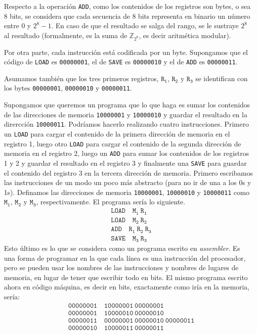\documentclass[a4paper, 12pt]{report}
\begin{document}
Respecto a la operación {\tt ADD}, como los contenidos de los registros son bytes, o sea 8 bits, se considera que cada secuencia de 8 bits representa en binario un número entre $0$ y $2^8-1$. En caso de que el resultado se salga del rango, se le sustraye $2^8$ al resultado (formalmente, es la suma de $\mathbb{Z}_{2^8}$, es decir aritmética modular).

Por otra parte, cada instrucción está codificada por un byte. Supongamos que el código de {\tt LOAD} es {\tt 00000001}, el de {\tt SAVE} es {\tt 00000010} y el de {\tt ADD} es {\tt 00000011}.

Asumamos también que los tres primeros registros, $\mathtt{R_1}$, $\mathtt{R_2}$ y $\mathtt{R_3}$ se identifican con los bytes {\tt 00000001}, {\tt 00000010} y {\tt 00000011}.

Supongamos que queremos un programa que lo que haga es sumar los contenidos de las direcciones de memoria {\tt 10000001} y {\tt 10000010} y guardar el resultado en la dirercción {\tt 10000011}. Podríamos hacerlo realizando cuatro instrucciones. Primero un {\tt LOAD} para cargar el contenido de la primera dirección de memoria en el registro 1, luego otro {\tt LOAD} para cargar el contenido de la segunda dirección de memoria en el registro 2, luego un {\tt ADD} para sumar los contenidos de los registros 1 y 2 y guardar el resultado en el registro 3 y finalmente una {\tt SAVE} para guardar el contenido del registro 3 en la tercera dirección de memoria. Primero escribamos las instrucciones de un modo un poco más abstracto (para no ir de una a los 0s y 1s).  Definamos las direcciones de memoria {\tt 10000001}, {\tt 10000010} y {\tt 10000011} como $\mathtt{M_1}$, $\mathtt{M_2}$ y $\mathtt{M_3}$, respectivamente. El programa sería lo siguiente.
\begin{align*}
	&\mathtt{LOAD} \quad\mathtt{M_1~R_1}\\
	&\mathtt{LOAD}  \quad\mathtt{M_2~R_2}\\
	&\mathtt{ADD}  \quad\mathtt{R_1~R_2~R_3}\\
	&\mathtt{SAVE}  \quad\mathtt{M_3~R_3}
\end{align*} 
Esto último es lo que se considera como un programa escrito en {\sl assembler}. Es una forma de programar en la que cada línea es una instrucción del procesador, pero se pueden usar los nombres de las instrucciones y nombres de lugares de memoria, en lugar de tener que escribir todo en bits. El mismo programa escrito ahora en código máquina, es decir en bits, exactamente como iría en la memoria, sería:
\begin{align*}
	&\mathtt{00000001} \quad\mathtt{10000001~00000001}\\
	&\mathtt{00000001}  \quad\mathtt{10000010~00000010}\\
	&\mathtt{00000011}  \quad\mathtt{00000001~00000010~00000011}\\
	&\mathtt{00000010}  \quad\mathtt{10000011~00000011}
\end{align*}
\end{document}
